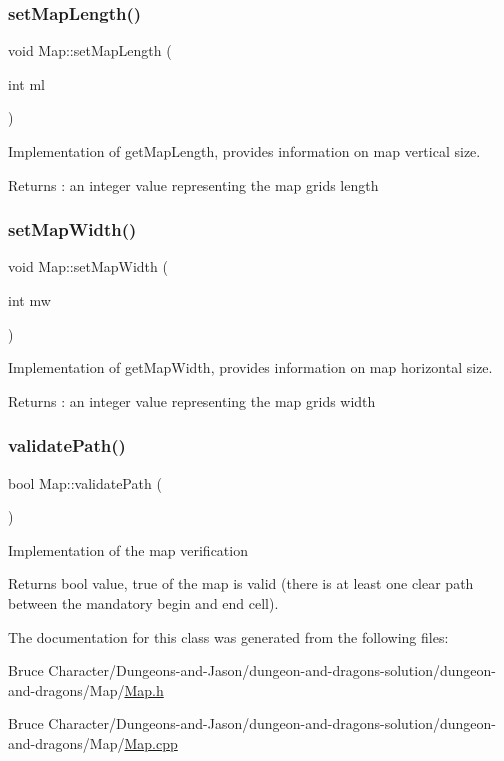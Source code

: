 \subsubsection{\texorpdfstring{set\+Map\+Length()}{setMapLength()}}
{\footnotesize\ttfamily void Map\+::set\+Map\+Length (\begin{DoxyParamCaption}\item[{int}]{ml }\end{DoxyParamCaption})}

Implementation of get\+Map\+Length, provides information on map vertical size. \begin{DoxyReturn}{Returns}
\+: an integer value representing the map grid\textquotesingle{}s length 
\end{DoxyReturn}
\hypertarget{class_map_a58b540416c67a94fba30bf513397cf45}{}\label{class_map_a58b540416c67a94fba30bf513397cf45} 
\subsubsection{\texorpdfstring{set\+Map\+Width()}{setMapWidth()}}
{\footnotesize\ttfamily void Map\+::set\+Map\+Width (\begin{DoxyParamCaption}\item[{int}]{mw }\end{DoxyParamCaption})}

Implementation of get\+Map\+Width, provides information on map horizontal size. \begin{DoxyReturn}{Returns}
\+: an integer value representing the map grid\textquotesingle{}s width 
\end{DoxyReturn}
\hypertarget{class_map_a91d9e239a9871b99a5d6d2d5d46b0504}{}\label{class_map_a91d9e239a9871b99a5d6d2d5d46b0504} 
\subsubsection{\texorpdfstring{validate\+Path()}{validatePath()}}
{\footnotesize\ttfamily bool Map\+::validate\+Path (\begin{DoxyParamCaption}{ }\end{DoxyParamCaption})}

Implementation of the map verification \begin{DoxyReturn}{Returns}
bool value, true of the map is valid (there is at least one clear path between the mandatory begin and end cell). 
\end{DoxyReturn}


The documentation for this class was generated from the following files\+:\begin{DoxyCompactItemize}
\item 
Bruce Character/\+Dungeons-\/and-\/\+Jason/dungeon-\/and-\/dragons-\/solution/dungeon-\/and-\/dragons/\+Map/\hyperlink{_map_8h}{Map.\+h}\item 
Bruce Character/\+Dungeons-\/and-\/\+Jason/dungeon-\/and-\/dragons-\/solution/dungeon-\/and-\/dragons/\+Map/\hyperlink{_map_8cpp}{Map.\+cpp}\end{DoxyCompactItemize}
